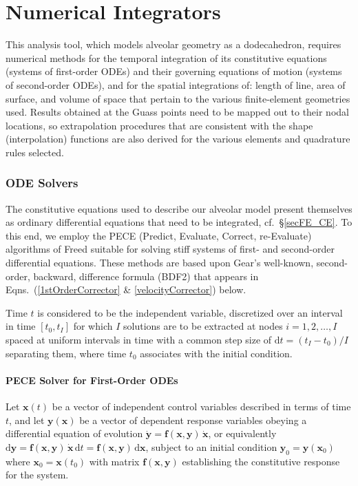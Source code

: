 \part{Numerical Integrators}
\label{partNumericalMethods}

This analysis tool, which models alveolar geometry as a dodecahedron, requires numerical methods for the temporal integration of its constitutive equations (systems of first-order ODEs) and their governing equations of motion (systems of second-order ODEs), and for the spatial integrations of: length of line, area of surface, and volume of space that pertain to the various finite-element geometries used.  Results obtained at the Guass points need to be mapped out to their nodal locations, so extrapolation procedures that are consistent with the shape (interpolation) functions are also derived for the various elements and quadrature rules selected.

\section{ODE Solvers}

The constitutive equations used to describe our alveolar model present themselves as ordinary differential equations that need to be integrated, cf.\ \S\ref{secFE_CE}.  To this end, we employ the PECE (Predict, Evaluate, Correct, re-Evaluate) algorithms of Freed \cite{Freed17a} suitable for solving stiff systems of first- and second-order differential equations.  These methods are based upon Gear's well-known, second-order, backward, difference formula (BDF2) that appears in Eqns.~(\ref{1stOrderCorrector} \& \ref{velocityCorrector}) below.

Time $t$ is considered to be the independent variable, discretized over an interval in time $[t_0, t_I]$ for which $I$ solutions are to be extracted at nodes $i=1, 2, \ldots, I$ spaced at uniform intervals in time with a common step size of $\mathrm{d}t = (t_I - t_0)/I$ separating them, where time $t_0$ associates with the initial condition.

\subsection{PECE Solver for First-Order ODEs}
\label{sec:1stOrderPECE}

Let $\mathbf{x}(t)$ be a vector of independent control variables described in terms of time $t$, and let $\mathbf{y} (\mathbf{x})$ be a vector of dependent response variables obeying a differential equation of evolution $\dot{\mathbf{y}} = \mathbf{f} (\mathbf{x}, \mathbf{y}) \, \dot{\mathbf{x}}$, or equivalently $\mathrm{d} \mathbf{y} = \mathbf{f} (\mathbf{x}, \mathbf{y}) \, \dot{\mathbf{x}} \, \mathrm{d} t = \mathbf{f} (\mathbf{x}, \mathbf{y}) \, \mathrm{d}\mathbf{x}$, subject to an initial condition $\mathbf{y}_0 = \mathbf{y}(\mathbf{x}_0)$ where $\mathbf{x}_0 = \mathbf{x} (t_0)$ with matrix $\mathbf{f} (\mathbf{x}, \mathbf{y})$ establishing the constitutive response for the system.

